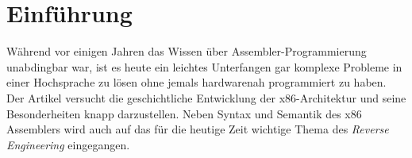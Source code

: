\section{Einführung}
Während vor einigen Jahren das Wissen über Assembler-Programmierung unabdingbar war, ist es heute ein leichtes Unterfangen gar komplexe Probleme in einer Hochsprache zu lösen ohne jemals hardwarenah programmiert zu haben.
Der Artikel versucht die geschichtliche Entwicklung der x86-Architektur und seine Besonderheiten knapp darzustellen.
Neben Syntax und Semantik des x86 Assemblers wird auch auf das für die heutige Zeit wichtige Thema des \textit{Reverse Engineering} eingegangen.
